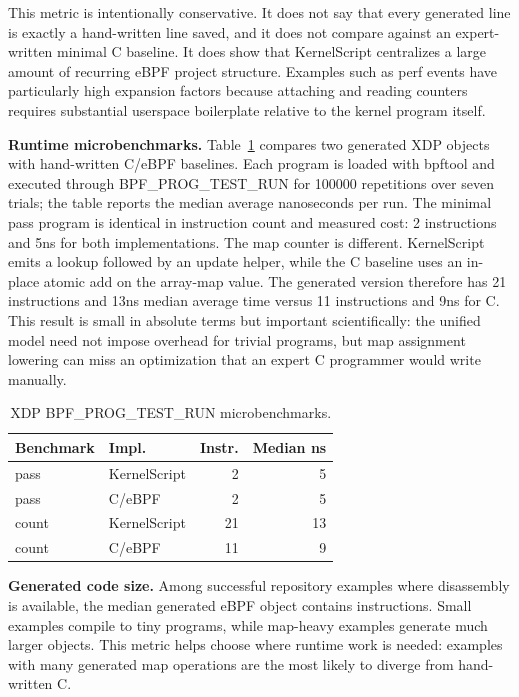 \documentclass[10pt,twocolumn]{article}
\newcommand{\tool}{KernelScript}
\begin{document}
This metric is intentionally conservative.  It does not say that every
generated line is exactly a hand-written line saved, and it does not compare
against an expert-written minimal C baseline.  It does show that \tool{}
centralizes a large amount of recurring eBPF project structure.  Examples such
as perf events have particularly high expansion factors because attaching and
reading counters requires substantial userspace boilerplate relative to the
kernel program itself.

\textbf{Runtime microbenchmarks.}  Table~\ref{tab:micro} compares two generated
XDP objects with hand-written C/eBPF baselines.  Each program is loaded with
bpftool and executed through BPF\_PROG\_TEST\_RUN for 100000 repetitions over
seven trials; the table reports the median average nanoseconds per run.  The
minimal pass program is identical in instruction count and measured cost:
2 instructions and 5ns for both implementations.  The map counter is different.
\tool{} emits a lookup followed by an update helper, while the C baseline uses
an in-place atomic add on the array-map value.  The generated version therefore
has 21 instructions and 13ns median average time versus 11 instructions and
9ns for C.  This result is small in absolute terms but important scientifically:
the unified model need not impose overhead for trivial programs, but map
assignment lowering can miss an optimization that an expert C programmer would
write manually.

\begin{table}[t]
\centering
\caption{XDP BPF\_PROG\_TEST\_RUN microbenchmarks.}
\label{tab:micro}
\begin{tabular}{llrr}
\toprule
Benchmark & Impl. & Instr. & Median ns \\
\midrule
pass & \tool{} & 2 & 5 \\
pass & C/eBPF & 2 & 5 \\
count & \tool{} & 21 & 13 \\
count & C/eBPF & 11 & 9 \\
\bottomrule
\end{tabular}
\end{table}

\textbf{Generated code size.}  Among successful repository examples where
disassembly is available, the median generated eBPF object contains
\KSMedianInstructions{} instructions.  Small examples compile to tiny programs,
while map-heavy examples generate much larger objects.  This metric helps
choose where runtime work is needed: examples with many generated map
operations are the most likely to diverge from hand-written C.
\end{document}
